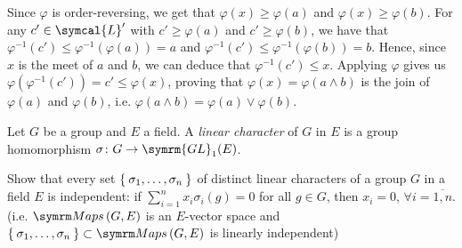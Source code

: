 \begin{solution}
\begin{enumerate}[(i)]
    Since \(\varphi\) is order-reversing, we get that \(\varphi(x) \geq \varphi(a)\) and \(\varphi(x) \geq \varphi(b)\). For any \(c' \in \symcal{L}'\) with \(c' \geq \varphi(a)\) and \(c' \geq \varphi(b)\), we have that \(\varphi^{-1} (c') \leq \varphi^{-1}(\varphi(a)) = a\) and \(\varphi^{-1} (c') \leq \varphi^{-1}(\varphi(b)) = b\). Hence, since \(x\) is the meet of \(a\) and \(b\), we can deduce that \(\varphi^{-1} (c') \leq x\). Applying \(\varphi\) gives us \(\varphi(\varphi^{-1}(c')) = c' \leq \varphi(x)\), proving that \(\varphi(x) = \varphi(a \wedge b)\) is the join of \(\varphi(a)\) and \(\varphi(b)\), i.e. \(\varphi(a \wedge b) = \varphi(a) \vee \varphi(b)\).
\end{enumerate}
\end{solution}

\begin{exercise}
Let \(G\) be a group and \(E\) a field. A \emph{linear character} of \(G\) in \(E\) is a group homomorphism \(\sigma \colon G \to \symrm{GL}_1 (E)\).

Show that every set \(\Set{ \sigma_1, \dots, \sigma_n }\) of distinct linear characters of a group \(G\) in a field \(E\) is independent: if \(\sum_{i=1}^{n} x_i \sigma_i(g) = 0\) for all \(g \in G\), then \(x_i = 0\), \(\forall i = \overline{1, n}\). (i.e. \(\Maps{G}{E}\) is an \(E\)-vector space and \(\Set{ \sigma_1, \dots, \sigma_n } \subset \Maps{G}{E}\) is linearly independent)
\end{exercise}
